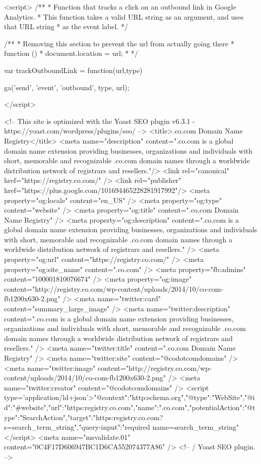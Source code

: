     <script>
      /**
      * Function that tracks a click on an outbound link in Google Analytics.
      * This function takes a valid URL string as an argument, and uses that URL string
      * as the event label.
      */

           /**
	    * Removing this section to prevent the url from actually going there
		* function () {
	         *  document.location = url;
        	 *  }
	  */

      var trackOutboundLink = function(url,type) {
         ga('send', 'event', 'outbound', type, url);
         
      }
    </script>


	
<!-- This site is optimized with the Yoast SEO plugin v6.3.1 - https://yoast.com/wordpress/plugins/seo/ -->
<title>.co.com Domain Name Registry</title>
<meta name="description" content=".co.com is a global domain name extension providing businesses, organizations and individuals with short, memorable and recognizable .co.com domain names through a worldwide distribution network of registrars and resellers."/>
<link rel="canonical" href="https://registry.co.com/" />
<link rel="publisher" href="https://plus.google.com/101694465228281917992"/>
<meta property="og:locale" content="en_US" />
<meta property="og:type" content="website" />
<meta property="og:title" content=".co.com Domain Name Registry" />
<meta property="og:description" content=".co.com is a global domain name extension providing businesses, organizations and individuals with short, memorable and recognizable .co.com domain names through a worldwide distribution network of registrars and resellers." />
<meta property="og:url" content="https://registry.co.com/" />
<meta property="og:site_name" content=".co.com" />
<meta property="fb:admins" content="100001810076674" />
<meta property="og:image" content="http://registry.co.com/wp-content/uploads/2014/10/co-com-fb1200x630-2.png" />
<meta name="twitter:card" content="summary_large_image" />
<meta name="twitter:description" content=".co.com is a global domain name extension providing businesses, organizations and individuals with short, memorable and recognizable .co.com domain names through a worldwide distribution network of registrars and resellers." />
<meta name="twitter:title" content=".co.com Domain Name Registry" />
<meta name="twitter:site" content="@codotcomdomains" />
<meta name="twitter:image" content="http://registry.co.com/wp-content/uploads/2014/10/co-com-fb1200x630-2.png" />
<meta name="twitter:creator" content="@codotcomdomains" />
<script type='application/ld+json'>{"@context":"http:\/\/schema.org","@type":"WebSite","@id":"#website","url":"https:\/\/registry.co.com\/","name":".co.com","potentialAction":{"@type":"SearchAction","target":"https:\/\/registry.co.com\/?s={search_term_string}","query-input":"required name=search_term_string"}}</script>
<meta name="msvalidate.01" content="0C4F17D606947BC1D6CA552074377A86" />
<!-- / Yoast SEO plugin. -->

